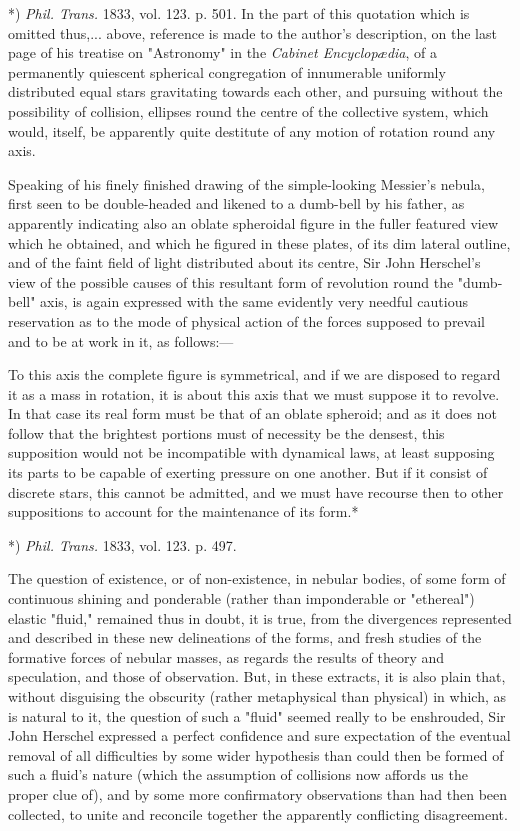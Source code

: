 \documentclass[a4paper, 12pt, oneside, polutonikogreek, english]{article}
\begin{document}
*) \emph{Phil. Trans.} 1833, vol. 123. p. 501. In the part of this quotation which is omitted thus,... above, reference is made to the author's description, on the last page of his treatise on "Astronomy" in the \emph{Cabinet Encyclopædia}, of a permanently quiescent spherical congregation of innumerable uniformly distributed equal stars gravitating towards each other, and pursuing without the possibility of collision, ellipses round the centre of the collective system, which would, itself, be apparently quite destitute of any motion of rotation round any axis.

Speaking of his finely finished drawing of the simple-looking Messier's nebula, first seen to be double-headed and likened to a dumb-bell by his father, as apparently indicating also an oblate spheroidal figure in the fuller featured view which he obtained, and which he figured in these plates, of its dim lateral outline, and of the faint field of light distributed about its centre, Sir John Herschel's view of the possible causes of this resultant form of revolution round the "dumb-bell" axis, is again expressed with the same evidently very needful cautious reservation as to the mode of physical action of the forces supposed to prevail and to be at work in it, as follows:---

To this axis the complete figure is symmetrical, and if we are disposed to regard it as a mass in rotation, it is about this axis that we must suppose it to revolve. In that case its real form must be that of an oblate spheroid; and as it does not follow that the brightest portions must of necessity be the densest, this supposition would not be incompatible with dynamical laws, at least supposing its parts to be capable of exerting pressure on one another. But if it consist of discrete stars, this cannot be admitted, and we must have recourse then to other suppositions to account for the maintenance of its form.*

*) \emph{Phil. Trans.} 1833, vol. 123. p. 497.

The question of existence, or of non-existence, in nebular bodies, of some form of continuous shining and ponderable (rather than imponderable or "ethereal") elastic "fluid," remained thus in doubt, it is true, from the divergences represented and described in these new delineations of the forms, and fresh studies of the formative forces of nebular masses, as regards the results of theory and speculation, and those of observation. But, in these extracts, it is also plain that, without disguising the obscurity (rather metaphysical than physical) in which, as is natural to it, the question of such a "fluid" seemed really to be enshrouded, Sir John Herschel expressed a perfect confidence and sure expectation of the eventual removal of all difficulties by some wider hypothesis than could then be formed of such a fluid's nature (which the assumption of collisions now affords us the proper clue of), and by some more confirmatory observations than had then been collected, to unite and reconcile together the apparently conflicting disagreement.
\end{document}
